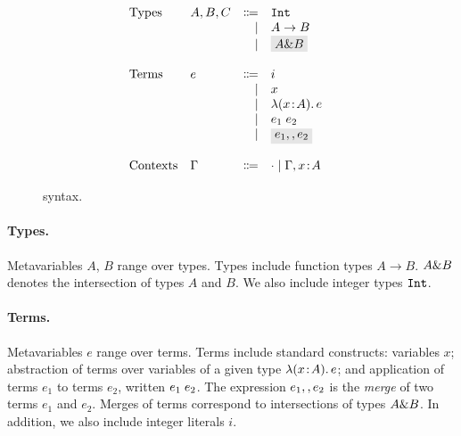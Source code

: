 \begin{figure}[t]
  \[
    \begin{array}{l}
      \begin{array}{llrll}
        \text{Types}
        & A, B, C & \Coloneqq & \code{Int} & \\
        &         & \mid      & A \to B    & \\
        &         & \mid      & \highlight{$A \inter B$}  & \\

        \\
        \text{Terms}
        & e & \Coloneqq & i            & \\
        &   & \mid & x                 & \\
        &   & \mid & \lamty x A e      & \\
        &   & \mid & \app {e_1} {e_2}  & \\
        &   & \mid & \highlight{$e_1 \mergeop e_2$}  & \\

        \\
        \text{Contexts}
        & \Gamma & \Coloneqq & \cdot
                   \mid \Gamma, x \oftype A  & \\
      \end{array}
    \end{array}
  \]

  \caption{\name syntax.}
  \label{fig:fi-syntax}
\end{figure}

\paragraph{Types.} Metavariables $A$, $B$ range over types. Types include
function types $A \to B$. $A \& B$ denotes the intersection of types $A$ and
$B$. We also include integer types $\texttt{Int}$.

\paragraph{Terms.} Metavariables $e$ range over terms.  Terms include standard
constructs: variables $x$; abstraction of terms over variables of a given type
$\lambda (x \!:\! A).\, e$; and application of terms $e_1$ to terms $e_2$, written $e_1 \; e_2$. The expression $e_1 ,, e_2$ is the \emph{merge} of two terms
$e_1$ and $e_2$. Merges of terms correspond to intersections of types $A \&
B$. In addition, we also include integer literals $i$.

